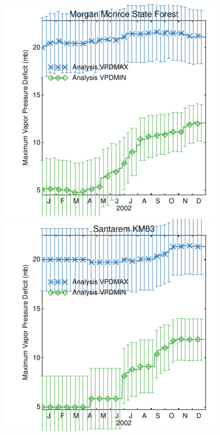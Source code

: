 \documentclass[a4paper,12pt]{article}
\begin{document}
\begin{figure}[hp]
\begin{center}
\includegraphics[scale=0.5]{Morgan_Monroe_State_Forest.dayplot.2002.VPDMAX.MODIS.pdf}
\includegraphics[scale=0.5]{Santarem_KM83.dayplot.2002.VPDMAX.MODIS.pdf}

\end{center}
\end{figure}
\end{document}
